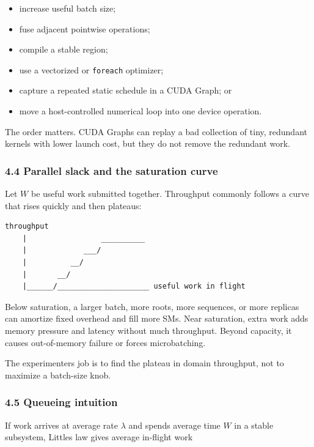 \documentclass[
  10pt,
  letterpaper,
]{article}
\providecommand{\tightlist}{%
  \setlength{\itemsep}{0pt}\setlength{\parskip}{0pt}}
\begin{document}
\begin{itemize}
\tightlist
\item
  increase useful batch size;
\item
  fuse adjacent pointwise operations;
\item
  compile a stable region;
\item
  use a vectorized or \texttt{foreach} optimizer;
\item
  capture a repeated static schedule in a CUDA Graph; or
\item
  move a host-controlled numerical loop into one device operation.
\end{itemize}

The order matters. CUDA Graphs can replay a bad collection of tiny,
redundant kernels with lower launch cost, but they do not remove the
redundant work.

\subsubsection{4.4 Parallel slack and the saturation
curve}\label{44-parallel-slack-and-the-saturation-curve}

Let \(W\) be useful work submitted together. Throughput commonly follows
a curve that rises quickly and then plateaus:

\begin{verbatim}
throughput
    |                 __________
    |             ___/
    |          __/
    |       __/
    |______/_____________________ useful work in flight
\end{verbatim}

Below saturation, a larger batch, more roots, more sequences, or more
replicas can amortize fixed overhead and fill more SMs. Near saturation,
extra work adds memory pressure and latency without much throughput.
Beyond capacity, it causes out-of-memory failure or forces
microbatching.

The experimenter\textquotesingle s job is to find the plateau in domain
throughput, not to maximize a batch-size knob.

\subsubsection{4.5 Queueing intuition}\label{45-queueing-intuition}

If work arrives at average rate \(\lambda\) and spends average time
\(W\) in a stable subsystem, Little\textquotesingle s law gives average
in-flight work
\end{document}
